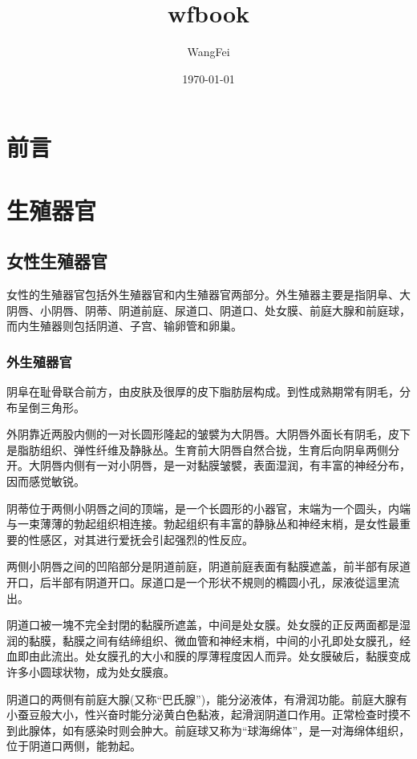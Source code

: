 \documentclass[12pt,UTF8]{ctexbook}
\title{\heiti\zihao{0} wfbook}
\author{WangFei}
\date{\today}
\begin{document}
\maketitle
\tableofcontents

\frontmatter

\chapter{前言}



\mainmatter

\chapter{生殖器官}

\section{女性生殖器官}

女性的生殖器官包括外生殖器官和内生殖器官两部分。外生殖器主要是指阴阜、大阴唇、小阴唇、阴蒂、阴道前庭、尿道口、阴道口、处女膜、前庭大腺和前庭球，而内生殖器则包括阴道、子宫、输卵管和卵巢。

\subsection{外生殖器官}

阴阜在耻骨联合前方，由皮肤及很厚的皮下脂肪层构成。到性成熟期常有阴毛，分布呈倒三角形。

外阴靠近两股内侧的一对长圆形隆起的皱襞为大阴唇。大阴唇外面长有阴毛，皮下是脂肪组织、弹性纤维及静脉丛。生育前大阴唇自然合拢，生育后向阴阜两侧分开。大阴唇内侧有一对小阴唇，是一对黏膜皱襞，表面湿润，有丰富的神经分布，因而感觉敏锐。

阴蒂位于两侧小阴唇之间的顶端，是一个长圆形的小器官，末端为一个圆头，内端与一束薄薄的勃起组织相连接。勃起组织有丰富的静脉丛和神经末梢，是女性最重要的性感区，对其进行爱抚会引起强烈的性反应。

两侧小阴唇之间的凹陷部分是阴道前庭，阴道前庭表面有黏膜遮盖，前半部有尿道开口，后半部有阴道开口。尿道口是一个形状不規则的橢圆小孔，尿液從這里流出。

阴道口被一塊不完全封閉的黏膜所遮盖，中间是处女膜。处女膜的正反两面都是湿润的黏膜，黏膜之间有结缔组织、微血管和神经末梢，中间的小孔即处女膜孔，经血即由此流出。处女膜孔的大小和膜的厚薄程度因人而异。处女膜破后，黏膜变成许多小圆球状物，成为处女膜痕。

阴道口的两侧有前庭大腺(又称“巴氏腺”)，能分泌液体，有滑润功能。前庭大腺有小蚕豆般大小，性兴奋时能分泌黄白色黏液，起滑润阴道口作用。正常检查时摸不到此腺体，如有感染时则会肿大。前庭球又称为“球海绵体”，是一对海绵体组织，位于阴道口两侧，能勃起。
\end{document}
